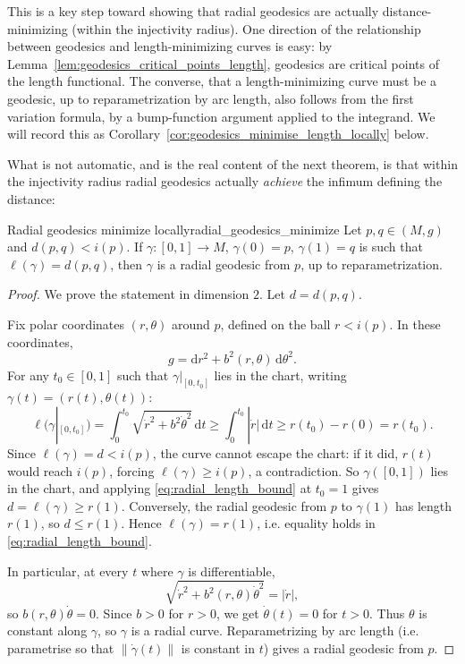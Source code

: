 This is a key step toward showing that radial geodesics are actually distance-minimizing (within the injectivity radius). One direction of the relationship between geodesics and length-minimizing curves is easy: by Lemma~\ref{lem:geodesics_critical_points_length}, geodesics are critical points of the length functional. The converse, that a length-minimizing curve must be a geodesic, up to reparametrization by arc length, also follows from the first variation formula, by a bump-function argument applied to the integrand. We will record this as Corollary~\ref{cor:geodesics_minimise_length_locally} below.

What is not automatic, and is the real content of the next theorem, is that within the injectivity radius radial geodesics actually \emph{achieve} the infimum defining the distance:


\begin{colortheo}{Radial geodesics minimize locally}{radial_geodesics_minimize}
Let $p, q \in (M,g)$ and $d(p,q) < i(p)$. If $\gamma \colon [0,1] \to M$, $\gamma(0) = p$, $\gamma(1) = q$ is such that $\ell(\gamma) = d(p,q)$, then $\gamma$ is a radial geodesic from $p$, up to reparametrization.
\end{colortheo}
\begin{proof}
We prove the statement in dimension $2$. Let $d = d(p,q)$.

Fix polar coordinates $(r,\theta)$ around $p$, defined on the ball $r < i(p)$. In these coordinates,
\[
g = \mathrm{d}r^2 + b^2(r,\theta)\,\mathrm{d}\theta^2.
\]
For any $t_0 \in [0,1]$ such that $\gamma|_{[0,t_0]}$ lies in the chart, writing $\gamma(t) = (r(t), \theta(t))$:
\begin{equation}\label{eq:radial_length_bound}
\ell(\gamma|_{[0,t_0]}) = \int_0^{t_0} \sqrt{\dot r^2 + b^2 \dot\theta^2}\,\mathrm{d}t \geqslant \int_0^{t_0} |\dot r|\,\mathrm{d}t \geqslant r(t_0) - r(0) = r(t_0).
\end{equation}
Since $\ell(\gamma) = d < i(p)$, the curve cannot escape the chart: if it did, $r(t)$ would reach $i(p)$, forcing $\ell(\gamma) \geqslant i(p)$, a contradiction. So $\gamma([0,1])$ lies in the chart, and applying \eqref{eq:radial_length_bound} at $t_0 = 1$ gives $d = \ell(\gamma) \geqslant r(1)$. Conversely, the radial geodesic from $p$ to $\gamma(1)$ has length $r(1)$, so $d \leqslant r(1)$. Hence $\ell(\gamma) = r(1)$, i.e. equality holds in \eqref{eq:radial_length_bound}.

In particular, at every $t$ where $\gamma$ is differentiable,
\[
\sqrt{\dot r^2 + b^2(r,\theta)\dot\theta^2} = |\dot r|,
\]
so $b(r,\theta)\dot\theta = 0$. Since $b > 0$ for $r > 0$, we get $\dot\theta(t) = 0$ for $t > 0$. Thus $\theta$ is constant along $\gamma$, so $\gamma$ is a radial curve. Reparametrizing by arc length (i.e. parametrise so that $\left\lVert \dot\gamma(t) \right\rVert$ is constant in $t$) gives a radial geodesic from $p$.
\end{proof}


